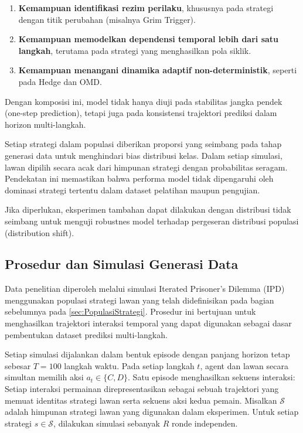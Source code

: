 \begin{enumerate}
    \item \textbf{Kemampuan identifikasi rezim perilaku}, khususnya pada strategi dengan titik perubahan (misalnya Grim Trigger).
    \item \textbf{Kemampuan memodelkan dependensi temporal lebih dari satu langkah}, terutama pada strategi yang menghasilkan pola siklik.
    \item \textbf{Kemampuan menangani dinamika adaptif non-deterministik}, seperti pada Hedge dan OMD.
\end{enumerate}

Dengan komposisi ini, model tidak hanya diuji pada stabilitas jangka pendek (one-step prediction), tetapi juga pada konsistensi trajektori prediksi dalam horizon multi-langkah.

Setiap strategi dalam populasi diberikan proporsi yang seimbang pada tahap generasi data untuk menghindari bias distribusi kelas. Dalam setiap simulasi, lawan dipilih secara acak dari himpunan strategi dengan probabilitas seragam. Pendekatan ini memastikan bahwa performa model tidak dipengaruhi oleh dominasi strategi tertentu dalam dataset pelatihan maupun pengujian.

Jika diperlukan, eksperimen tambahan dapat dilakukan dengan distribusi tidak seimbang untuk menguji robustnes model terhadap pergeseran distribusi populasi (distribution shift).

\subsection{Prosedur dan Simulasi Generasi Data}

Data penelitian diperoleh melalui simulasi Iterated Prisoner's Dilemma (IPD) menggunakan populasi strategi lawan yang telah didefinisikan pada bagian sebelumnya pada \ref{sec:PopulasiStrategi}. Prosedur ini bertujuan untuk menghasilkan trajektori interaksi temporal yang dapat digunakan sebagai dasar pembentukan dataset prediksi multi-langkah.

Setiap simulasi dijalankan dalam bentuk episode dengan panjang horizon tetap sebesar $T = 100$ langkah waktu. Pada setiap langkah $t$, agent dan lawan secara simultan memilih aksi $a_t \in \{C, D\}$. Satu episode menghasilkan sekuens interaksi:
Setiap interaksi permainan direpresentasikan sebagai sebuah trajektori
yang memuat identitas strategi lawan serta sekuens aksi kedua pemain.
Misalkan $\mathcal{S}$ adalah himpunan strategi lawan yang digunakan
dalam eksperimen. Untuk setiap strategi $s \in \mathcal{S}$,
dilakukan simulasi sebanyak $R$ ronde independen.

